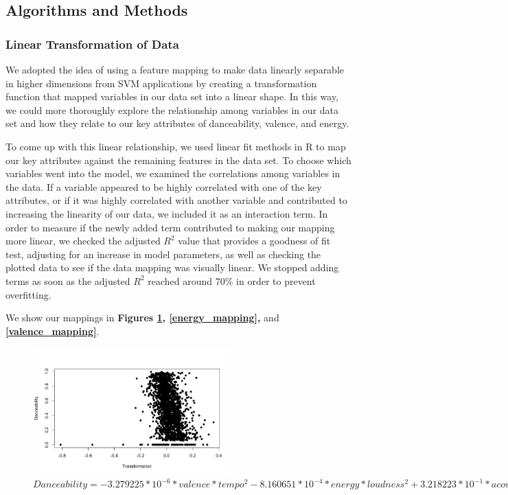 \documentclass{article}
\begin{document}
\subsection{Algorithms and Methods}
\subsubsection{Linear Transformation of Data}\label{transform}
We adopted the idea of using a feature mapping to make data linearly separable
in higher dimensions from SVM applications by creating a transformation function
that mapped variables in our data set into a linear shape. In this way, we could
more thoroughly explore the relationship among variables in our data set and how
they relate to our key attributes of danceability, valence, and energy.

To come up with this linear relationship, we used linear fit methods in R to map
our key attributes against the remaining features in the data set. To choose
which variables went into the model, we examined the correlations among variables
in the data. If a variable appeared to be highly correlated with one of the key
attributes, or if it was highly correlated with another variable and contributed
to increasing the linearity of our data, we included it as an interaction term.
In order to measure if the newly added term contributed to making our mapping
more linear, we checked the adjusted $ R^{2} $ value that provides a goodness of
fit test, adjusting for an increase in model parameters, as well as checking the
plotted data to see if the data mapping was visually linear. We stopped adding
terms as soon as the adjusted $ R^{2} $ reached around 70\% in order to prevent
overfitting.

We show our mappings in \textbf{Figures \ref{dance_mapping}, \ref{energy_mapping},}
and \textbf{\ref{valence_mapping}}.

\begin{figure}[H]
  \includegraphics[width=3in]{../images/danceability.png}
  \caption{$ Danceability =
      -3.279225 * 10^{-6} * valence * tempo^{2}
      -8.160651 * 10^{-4} * energy * loudness^{2}
      +3.218223 * 10^{-1} * acousticness * energy^{2}
      -3.279225 * 10^{-6} * liveness * speechiness
      +3.793979 * 10^{-4} * tempo * energy
      -7.492498 * 10^{-3} * loudness * acousticness
      +7.001209 * 10^{-2} * instrumentalness * valence
      -6.132415 * 10^{-4} * valence * loudness
      +1.359087 * 10^{-2} * energy * loudness *valence^{2} $}
  \label{dance_mapping}
\end{figure}
\end{document}
